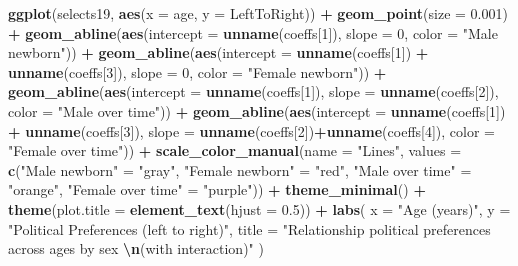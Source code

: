 \documentclass[
]{book}
\newenvironment{Shaded}{\begin{snugshade}}{\end{snugshade}}
\newcommand{\AttributeTok}[1]{\textcolor[rgb]{0.13,0.29,0.53}{#1}}
\newcommand{\DecValTok}[1]{\textcolor[rgb]{0.00,0.00,0.81}{#1}}
\newcommand{\FloatTok}[1]{\textcolor[rgb]{0.00,0.00,0.81}{#1}}
\newcommand{\FunctionTok}[1]{\textcolor[rgb]{0.13,0.29,0.53}{\textbf{#1}}}
\newcommand{\NormalTok}[1]{#1}
\newcommand{\OtherTok}[1]{\textcolor[rgb]{0.56,0.35,0.01}{#1}}
\newcommand{\SpecialCharTok}[1]{\textcolor[rgb]{0.81,0.36,0.00}{\textbf{#1}}}
\newcommand{\StringTok}[1]{\textcolor[rgb]{0.31,0.60,0.02}{#1}}
\begin{document}
\begin{Shaded}
\begin{Highlighting}[]
\FunctionTok{ggplot}\NormalTok{(selects19, }\FunctionTok{aes}\NormalTok{(}\AttributeTok{x =}\NormalTok{ age, }\AttributeTok{y =}\NormalTok{ LeftToRight)) }\SpecialCharTok{+} 
  \FunctionTok{geom\_point}\NormalTok{(}\AttributeTok{size =} \FloatTok{0.001}\NormalTok{) }\SpecialCharTok{+}
  \FunctionTok{geom\_abline}\NormalTok{(}\FunctionTok{aes}\NormalTok{(}\AttributeTok{intercept =} \FunctionTok{unname}\NormalTok{(coeffs[}\DecValTok{1}\NormalTok{]), }\AttributeTok{slope =} \DecValTok{0}\NormalTok{, }\AttributeTok{color =} \StringTok{"Male newborn"}\NormalTok{)) }\SpecialCharTok{+}
  \FunctionTok{geom\_abline}\NormalTok{(}\FunctionTok{aes}\NormalTok{(}\AttributeTok{intercept =} \FunctionTok{unname}\NormalTok{(coeffs[}\DecValTok{1}\NormalTok{]) }\SpecialCharTok{+} \FunctionTok{unname}\NormalTok{(coeffs[}\DecValTok{3}\NormalTok{]), }\AttributeTok{slope =} \DecValTok{0}\NormalTok{, }\AttributeTok{color =} \StringTok{"Female newborn"}\NormalTok{)) }\SpecialCharTok{+}
  \FunctionTok{geom\_abline}\NormalTok{(}\FunctionTok{aes}\NormalTok{(}\AttributeTok{intercept =} \FunctionTok{unname}\NormalTok{(coeffs[}\DecValTok{1}\NormalTok{]), }\AttributeTok{slope =} \FunctionTok{unname}\NormalTok{(coeffs[}\DecValTok{2}\NormalTok{]), }\AttributeTok{color =} \StringTok{"Male over time"}\NormalTok{)) }\SpecialCharTok{+}
  \FunctionTok{geom\_abline}\NormalTok{(}\FunctionTok{aes}\NormalTok{(}\AttributeTok{intercept =} \FunctionTok{unname}\NormalTok{(coeffs[}\DecValTok{1}\NormalTok{]) }\SpecialCharTok{+} \FunctionTok{unname}\NormalTok{(coeffs[}\DecValTok{3}\NormalTok{]), }\AttributeTok{slope =} \FunctionTok{unname}\NormalTok{(coeffs[}\DecValTok{2}\NormalTok{])}\SpecialCharTok{+}\FunctionTok{unname}\NormalTok{(coeffs[}\DecValTok{4}\NormalTok{]), }\AttributeTok{color =} \StringTok{"Female over time"}\NormalTok{)) }\SpecialCharTok{+}
  \FunctionTok{scale\_color\_manual}\NormalTok{(}\AttributeTok{name =} \StringTok{"Lines"}\NormalTok{, }\AttributeTok{values =} \FunctionTok{c}\NormalTok{(}\StringTok{"Male newborn"} \OtherTok{=} \StringTok{"gray"}\NormalTok{, }\StringTok{"Female newborn"} \OtherTok{=} \StringTok{"red"}\NormalTok{, }\StringTok{"Male over time"} \OtherTok{=} \StringTok{"orange"}\NormalTok{, }\StringTok{"Female over time"} \OtherTok{=} \StringTok{"purple"}\NormalTok{)) }\SpecialCharTok{+}
  \FunctionTok{theme\_minimal}\NormalTok{() }\SpecialCharTok{+}
  \FunctionTok{theme}\NormalTok{(}\AttributeTok{plot.title =} \FunctionTok{element\_text}\NormalTok{(}\AttributeTok{hjust =} \FloatTok{0.5}\NormalTok{)) }\SpecialCharTok{+}
  \FunctionTok{labs}\NormalTok{(}
    \AttributeTok{x =} \StringTok{"Age (years)"}\NormalTok{,}
    \AttributeTok{y =} \StringTok{"Political Preferences (left to right)"}\NormalTok{,}
    \AttributeTok{title =} \StringTok{"Relationship political preferences across ages by sex }\SpecialCharTok{\textbackslash{}n}\StringTok{(with interaction)"}
\NormalTok{  )}
\end{Highlighting}
\end{Shaded}
\end{document}
